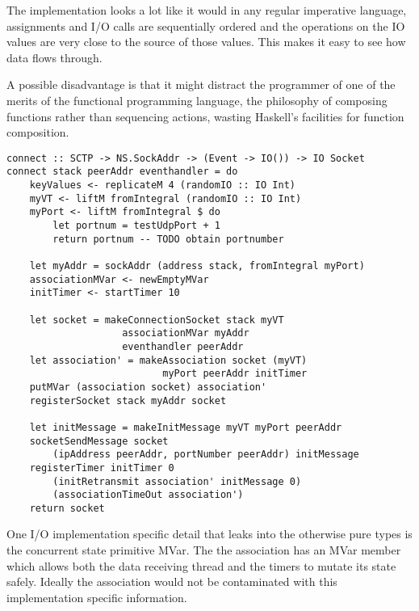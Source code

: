 
The implementation looks a lot like it would in any regular imperative language, assignments and I/O calls are sequentially ordered and the operations on the IO values are very close to the source of those values. This makes it easy to see how data flows through.

A possible disadvantage is that it might distract the programmer of one of the merits of the functional programming language, the philosophy of composing functions rather than sequencing actions, wasting Haskell's facilities for function composition. 

\begin{lstlisting}[caption={The connect function looks imperative}]
connect :: SCTP -> NS.SockAddr -> (Event -> IO()) -> IO Socket
connect stack peerAddr eventhandler = do
    keyValues <- replicateM 4 (randomIO :: IO Int)
    myVT <- liftM fromIntegral (randomIO :: IO Int)
    myPort <- liftM fromIntegral $ do 
        let portnum = testUdpPort + 1
        return portnum -- TODO obtain portnumber

    let myAddr = sockAddr (address stack, fromIntegral myPort)
    associationMVar <- newEmptyMVar
    initTimer <- startTimer 10

    let socket = makeConnectionSocket stack myVT
                    associationMVar myAddr
                    eventhandler peerAddr
    let association' = makeAssociation socket (myVT) 
                           myPort peerAddr initTimer
    putMVar (association socket) association'
    registerSocket stack myAddr socket

    let initMessage = makeInitMessage myVT myPort peerAddr
    socketSendMessage socket 
        (ipAddress peerAddr, portNumber peerAddr) initMessage
    registerTimer initTimer 0 
        (initRetransmit association' initMessage 0)
        (associationTimeOut association')
    return socket
\end{lstlisting}

One I/O implementation specific detail that leaks into the otherwise pure types is the concurrent state primitive MVar. The the association has an MVar member which allows both the data receiving thread and the timers to mutate its state safely. Ideally the association would not be contaminated with this implementation specific information.


